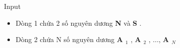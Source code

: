 Input
\begin{itemize}
	\item Dòng 1 chứa 2 số nguyên dương \textbf{ N } và \textbf{ S } .
	\item Dòng 2 chứa N số nguyên dương \textbf{ A $_ 1 $} , \textbf{ A $_ 2 $} , ..., \textbf{ A $_ N $}
\end{itemize}